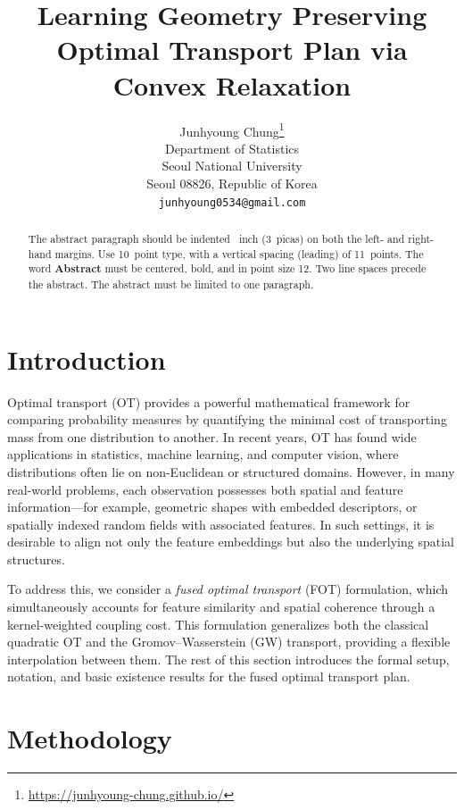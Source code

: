 \documentclass{article}
\title{Learning Geometry Preserving Optimal Transport Plan via Convex Relaxation}
\author{%
  Junhyoung Chung\thanks{\href{https://junhyoung-chung.github.io/}{https://junhyoung-chung.github.io/}} \\
  Department of Statistics\\
  Seoul National University\\
  Seoul 08826, Republic of Korea \\
  \texttt{junhyoung0534@gmail.com} \\
}
\begin{document}
\maketitle


\begin{abstract}
  The abstract paragraph should be indented ~inch (3~picas) on
  both the left- and right-hand margins. Use 10~point type, with a vertical
  spacing (leading) of 11~points.  The word \textbf{Abstract} must be centered,
  bold, and in point size 12. Two line spaces precede the abstract. The abstract
  must be limited to one paragraph.
\end{abstract}


\section{Introduction}

Optimal transport (OT) provides a powerful mathematical framework for comparing probability measures by quantifying the minimal cost of transporting mass from one distribution to another. In recent years, OT has found wide applications in statistics, machine learning, and computer vision, where distributions often lie on non-Euclidean or structured domains. However, in many real-world problems, each observation possesses both spatial and feature information---for example, geometric shapes with embedded descriptors, or spatially indexed random fields with associated features. In such settings, it is desirable to align not only the feature embeddings but also the underlying spatial structures.

To address this, we consider a \emph{fused optimal transport} (FOT) formulation, which simultaneously accounts for feature similarity and spatial coherence through a kernel-weighted coupling cost. This formulation generalizes both the classical quadratic OT and the Gromov--Wasserstein (GW) transport, providing a flexible interpolation between them. The rest of this section introduces the formal setup, notation, and basic existence results for the fused optimal transport plan.

\section{Methodology}

\end{document}
